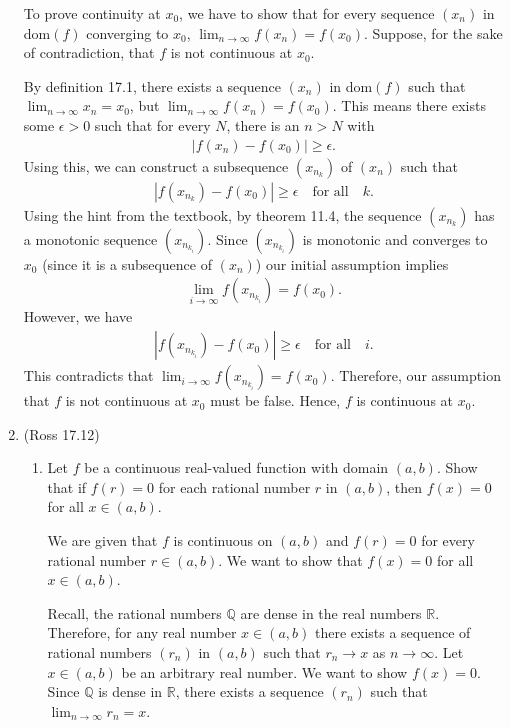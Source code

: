 \documentclass [10pt]{article}
\newcommand{\jg}[1]{{\color{blue} #1}}
\begin{document}
\begin{enumerate}
{To prove continuity at $x_0$, we have to show that for every sequence $(x_n)$ in dom$(f)$ converging to $x_0$, $\lim_{n \to \infty} f(x_n) = f(x_0)$. Suppose, for the sake of contradiction, that $f$ is not continuous at $x_0$. 

By definition 17.1, there exists a sequence $(x_n)$ in dom$(f)$ such that $\lim_{n \to \infty} x_n = x_0$, but $\lim_{n \to \infty} f(x_n) = f(x_0)$. This means there exists some $\epsilon > 0$ such that for every $N$, there is an $n > N$ with
\begin{align*}
    |f(x_n) - f(x_0) | \geq \epsilon.
\end{align*}
Using this, we can construct a subsequence $(x_{n_k})$ of $(x_n)$ such that 
\begin{align*}
    |f(x_{n_k}) - f(x_0) | \geq \epsilon \quad \text{for all} \quad k.
\end{align*}
Using the hint from the textbook, by theorem 11.4, the sequence $(x_{n_k})$ has a monotonic sequence $(x_{n_{k_i}})$. Since $(x_{n_{k_i}})$ is monotonic and converges to $x_0$ (since it is a subsequence of $(x_n)$) our initial assumption implies 
\begin{align*}
    \lim_{i\to \infty} f(x_{n_{k_i}}) = f(x_0).
\end{align*}
However, we have 
\begin{align*}
    |f(x_{n_{k_i}}) - f(x_0) | \geq \epsilon \quad \text{for all} \quad i.
\end{align*}
This contradicts that $ \lim_{i\to \infty} f(x_{n_{k_i}}) = f(x_0).$ Therefore, our assumption that $f$ is not continuous at $x_0$ must be false. Hence, $f$ is continuous at $x_0$. 


}

\clearpage
\item (Ross 17.12)
\begin{enumerate}
\item Let $f$ be a continuous real-valued function with domain $(a, b)$. Show that if $f(r)=0$ for each rational number $r$ in $(a, b)$, then $f(x)=0$ for all $x \in(a, b)$.

\jg{
We are given that $f$ is continuous on $(a,b)$ and $f(r) = 0$ for every rational number $r \in (a,b)$. We want to show that $f(x)=0$ for all $x \in (a,b)$. 

Recall, the rational numbers $\mathbb{Q}$ are dense in the real numbers $\mathbb{R}$. Therefore, for any real number $x \in (a,b)$ there exists a sequence of rational numbers $(r_n)$ in $(a,b)$ such that $r_n \to x$ as $n \to \infty$. Let $x \in (a,b)$ be an arbitrary real number. We want to show $f(x) = 0$. Since $\mathbb{Q}$ is dense in $\mathbb{R}$, there exists a sequence $(r_n)$ such that $\lim_{n\to \infty} r_n = x$. 

}
\end{enumerate}
\end{enumerate}
\end{document}
